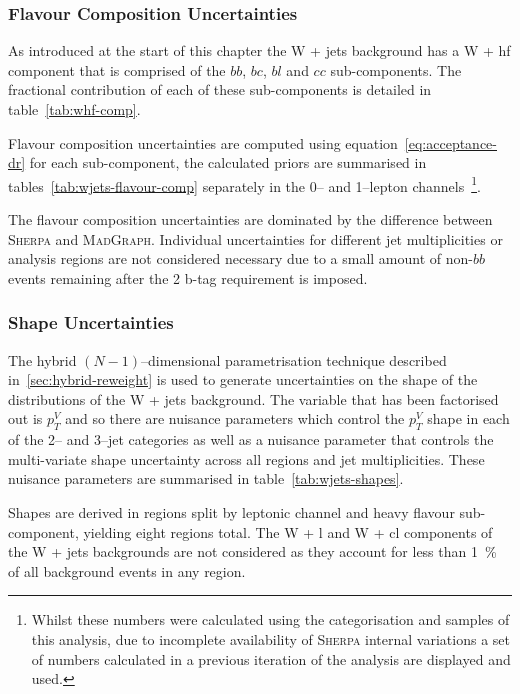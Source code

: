 \subsubsection{Flavour Composition Uncertainties}

As introduced at the start of this chapter the W + jets background has a W + hf
component that is comprised of the $bb$, $bc$, $bl$ and $cc$ sub-components. The
fractional contribution of each of these sub-components is detailed in
table~\ref{tab:whf-comp}.

Flavour composition uncertainties are computed using
equation~\ref{eq:acceptance-dr} for each sub-component, the calculated priors
are summarised in tables~\ref{tab:wjets-flavour-comp} separately in the 0-- and
1--lepton channels~\footnote{Whilst these numbers were calculated using the
  categorisation and samples of this analysis, due to incomplete availability of
  \textsc{Sherpa} internal variations a set of numbers calculated in a previous
  iteration of the analysis are displayed and used.}.

The flavour composition uncertainties are dominated by the difference between
\textsc{Sherpa} and \textsc{MadGraph}. Individual uncertainties for different
jet multiplicities or analysis regions are not considered necessary due to a
small amount of non-$bb$ events remaining after the 2 b-tag requirement is
imposed.

\subsubsection{Shape Uncertainties}

The hybrid $(N-1)$--dimensional parametrisation technique described
in~\ref{sec:hybrid-reweight} is used to generate uncertainties on the shape of
the distributions of the W + jets background. The variable that has been
factorised out is $p_T^V$ and so there are nuisance parameters which control the
$p_T^V$ shape in each of the 2-- and 3--jet categories as well as a nuisance
parameter that controls the multi-variate shape uncertainty across all regions
and jet multiplicities. These nuisance parameters are summarised in
table~\ref{tab:wjets-shapes}.


Shapes are derived in regions split by leptonic channel and heavy flavour
sub-component, yielding eight regions total. The W + l and W + cl components of
the W + jets backgrounds are not considered as they account for less than 1~\%
of all background events in any region.

